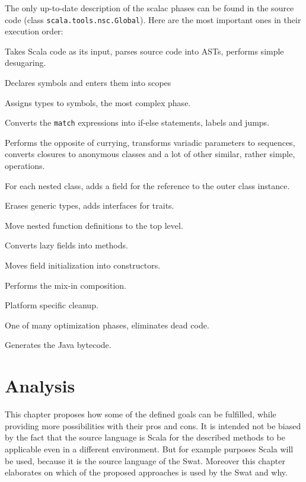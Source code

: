 \documentclass[12pt,a4paper]{report}
\begin{document}
The only up-to-date description of the scalac phases can be found in the source code (class \texttt{scala.tools.nsc.Global}). Here are the most important ones in their execution order:

\begin{description}[style=multiline,leftmargin=5cm]
\item[\texttt{syntaxAnalyzer}] Takes Scala code as its input, parses source code into ASTs, performs simple desugaring.
\item[\texttt{namerFactory}] Declares symbols and enters them into scopes
\item[\texttt{typerFactory}] Assigns types to symbols, the most complex phase.
\item[\texttt{patmat}] Converts the \texttt{match} expressions into if-else statements, labels and jumps.
\item[\texttt{uncurry}] Performs the opposite of currying, transforms variadic parameters to sequences, converts closures to anonymous classes and a lot of other similar, rather simple, operations. 
\item[\texttt{explicitOuter}] For each nested class, adds a field for the reference to the outer class instance. 
\item[\texttt{erasure}] Erases generic types, adds interfaces for traits.
\item[\texttt{lambdaLift}] Move nested function definitions to the top level.
\item[\texttt{lazyVals}] Converts lazy fields into methods.
\item[\texttt{constructors}] Moves field initialization into constructors.
\item[\texttt{mixer}] Performs the mix-in composition.
\item[\texttt{cleanup}] Platform specific cleanup.
\item[\texttt{deadCode}] One of many optimization phases, eliminates dead code.
\item[\texttt{jvm}] Generates the Java bytecode.
\end{description}



\chapter{Analysis}
\label{sec:Analysis}

This chapter proposes how some of the defined goals can be fulfilled, while providing more possibilities with their pros and cons. It is intended not be biased by the fact that the source language is Scala for the described methods to be applicable even in a different environment. But for example purposes Scala will be used, because it is the source language of the Swat. Moreover this chapter elaborates on which of the proposed approaches is used by the Swat and why.
\end{document}
